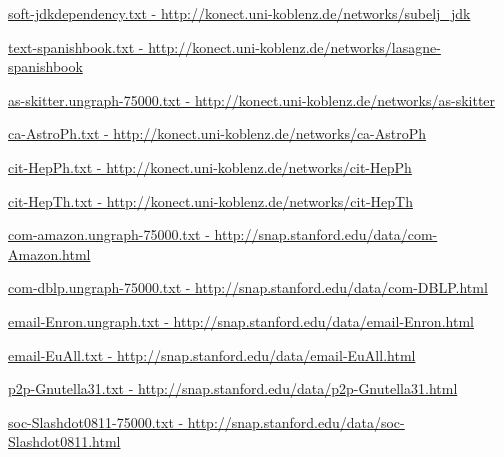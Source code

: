 \url{soft-jdkdependency.txt - http://konect.uni-koblenz.de/networks/subelj_jdk}

\url{text-spanishbook.txt - http://konect.uni-koblenz.de/networks/lasagne-spanishbook}

\url{as-skitter.ungraph-75000.txt - http://konect.uni-koblenz.de/networks/as-skitter}

\url{ca-AstroPh.txt - http://konect.uni-koblenz.de/networks/ca-AstroPh}

\url{cit-HepPh.txt - http://konect.uni-koblenz.de/networks/cit-HepPh}

\url{cit-HepTh.txt - http://konect.uni-koblenz.de/networks/cit-HepTh}

\url{com-amazon.ungraph-75000.txt - http://snap.stanford.edu/data/com-Amazon.html}

\url{com-dblp.ungraph-75000.txt - http://snap.stanford.edu/data/com-DBLP.html}

\url{email-Enron.ungraph.txt - http://snap.stanford.edu/data/email-Enron.html}

\url{email-EuAll.txt - http://snap.stanford.edu/data/email-EuAll.html}

\url{p2p-Gnutella31.txt - http://snap.stanford.edu/data/p2p-Gnutella31.html}

\url{soc-Slashdot0811-75000.txt - http://snap.stanford.edu/data/soc-Slashdot0811.html}
